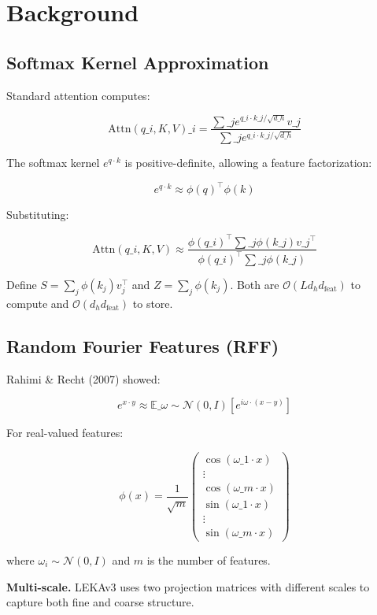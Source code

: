 \section{Background}

\subsection{Softmax Kernel Approximation}

Standard attention computes:

\[
\text{Attn}(q\_i, K, V)\_i = \frac{\sum\_j e^{q\_i \cdot k\_j / \sqrt{d\_h}} v\_j}{\sum\_j e^{q\_i \cdot k\_j / \sqrt{d\_h}}}
\tag{3.1}
\]

The softmax kernel $e^{q \cdot k}$ is positive-definite, allowing a feature 
factorization:

\[
e^{q \cdot k} \approx \phi(q)^\top \phi(k)
\tag{3.2}
\]

Substituting:

\[
\text{Attn}(q\_i, K, V) \approx \frac{\phi(q\_i)^\top \sum\_j \phi(k\_j) v\_j^\top}{\phi(q\_i)^\top \sum\_j \phi(k\_j)}
\tag{3.3}
\]

Define $S = \sum_j \phi(k_j) v_j^\top$ and $Z = \sum_j \phi(k_j)$. Both are 
$\mathcal{O}(L d_h d_\text{feat})$ to compute and $\mathcal{O}(d_h d_\text{feat})$ 
to store.

\subsection{Random Fourier Features (RFF)}

Rahimi \& Recht (2007) showed:

\[
e^{x \cdot y} \approx \mathbb{E}\_{\omega \sim \mathcal{N}(0, I)}\left[e^{i \omega \cdot (x - y)}\right]
\tag{3.4}
\]

For real-valued features:

\[
\phi(x) = \frac{1}{\sqrt{m}} \begin{pmatrix} \cos(\omega\_1 \cdot x) \\ \vdots \\ \cos(\omega\_m \cdot x) \\ \sin(\omega\_1 \cdot x) \\ \vdots \\ \sin(\omega\_m \cdot x) \end{pmatrix}
\tag{3.5}
\]

where $\omega_i \sim \mathcal{N}(0, I)$ and $m$ is the number of features.

\textbf{Multi-scale.} LEKAv3 uses two projection matrices with different scales 
to capture both fine and coarse structure.

